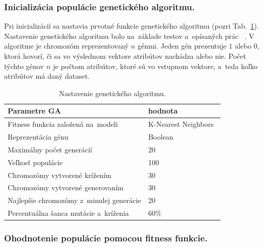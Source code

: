 \documentclass[runningheads]{llncs}
\begin{document}
\subsubsection{Inicializácia populácie genetického algoritmu.}

Pri inicializácií sa nastavia prvotné funkcie genetického algoritmu (pozri Tab.~\ref{tab_nastavenie_gen_alg}). Nastavenie genetického algoritmu bolo na~základe testov a~opísaných prác ~\cite{ref_babatunde}.
V algoritme je chromozóm reprezentovaný \begin{math}n\end{math} génmi. Jeden gén prezentuje \begin{math}1\end{math} 
alebo \begin{math}0\end{math}, ktorá hovorí, či sa vo výslednom vektore atribútov nachádza alebo nie. 
Počet týchto génov \begin{math}n\end{math} je počtom atribútov, ktoré sú vo vstupnom vektore, a~teda 
koľko atribútov má daný dataset.

\begin{table}[]
\centering
\caption{Nastavenie genetického algoritmu.}\label{tab_nastavenie_gen_alg}
\begin{tabular}{|l|l|}
\hline
\textbf{Parametre GA}                    & \textbf{hodnota}  \\ \hline
Fitness funkcia založená na~modeli           & K-Nearest Neighbors~\cite{ref_babatunde} \\ \hline
Reprezentácia génu                       & Boolean  \\ \hline
Maximálny počet generácií                & 20       \\ \hline
Veľkosť populácie                        & 100      \\ \hline
Chromozómy vytvorené krížením            & 30       \\ \hline
Chromozómy vytvorené generovaním         & 30       \\ \hline
Najlepšie chromozómy z~minulej generácie & 20       \\ \hline
Percentuálna šanca mutácie a~kríženia    & 60\%     \\ \hline
\end{tabular}
\end{table}

\subsubsection{Ohodnotenie populácie pomocou fitness funkcie.}
\end{document}

